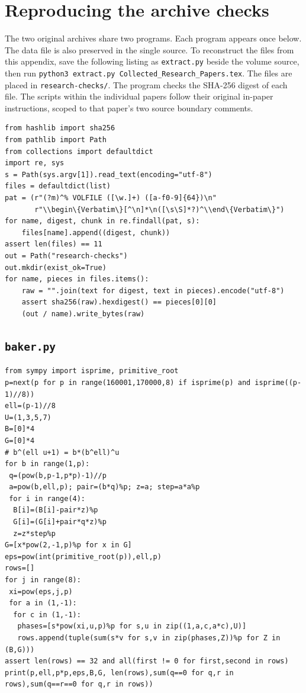 \documentclass[11pt,a4paper]{article}
\begin{document}
\section{Reproducing the archive checks}
The two original archives share two programs. Each program appears once below. The data file is also preserved in the single source. To reconstruct the files from this appendix, save the following listing as \texttt{extract.py} beside the volume source, then run \texttt{python3 extract.py Collected\_Research\_Papers.tex}. The files are placed in \texttt{research-checks/}. The program checks the SHA-256 digest of each file. The scripts within the individual papers follow their original in-paper instructions, scoped to that paper's two source boundary comments.

\begin{Verbatim}[fontsize=\small]
from hashlib import sha256
from pathlib import Path
from collections import defaultdict
import re, sys
s = Path(sys.argv[1]).read_text(encoding="utf-8")
files = defaultdict(list)
pat = (r"(?m)^% VOLFILE ([\w.]+) ([a-f0-9]{64})\n"
       r"\\begin\{Verbatim\}[^\n]*\n([\s\S]*?)^\\end\{Verbatim\}")
for name, digest, chunk in re.findall(pat, s):
    files[name].append((digest, chunk))
assert len(files) == 11
out = Path("research-checks")
out.mkdir(exist_ok=True)
for name, pieces in files.items():
    raw = "".join(text for digest, text in pieces).encode("utf-8")
    assert sha256(raw).hexdigest() == pieces[0][0]
    (out / name).write_bytes(raw)
\end{Verbatim}
\subsection*{\texttt{baker.py}}
\begin{Verbatim}[fontsize=\footnotesize,breakanywhere=false]
from sympy import isprime, primitive_root
p=next(p for p in range(160001,170000,8) if isprime(p) and isprime((p-1)//8))
ell=(p-1)//8
U=(1,3,5,7)
B=[0]*4
G=[0]*4
# b^(ell u+1) = b*(b^ell)^u
for b in range(1,p):
 q=(pow(b,p-1,p*p)-1)//p
 a=pow(b,ell,p); pair=(b*q)%p; z=a; step=a*a%p
 for i in range(4):
  B[i]=(B[i]-pair*z)%p
  G[i]=(G[i]+pair*q*z)%p
  z=z*step%p
G=[x*pow(2,-1,p)%p for x in G]
eps=pow(int(primitive_root(p)),ell,p)
rows=[]
for j in range(8):
 xi=pow(eps,j,p)
 for a in (1,-1):
  for c in (1,-1):
   phases=[s*pow(xi,u,p)%p for s,u in zip((1,a,c,a*c),U)]
   rows.append(tuple(sum(s*v for s,v in zip(phases,Z))%p for Z in (B,G)))
assert len(rows) == 32 and all(first != 0 for first,second in rows)
print(p,ell,p*p,eps,B,G, len(rows),sum(q==0 for q,r in rows),sum(q==r==0 for q,r in rows))
\end{Verbatim}
\end{document}
